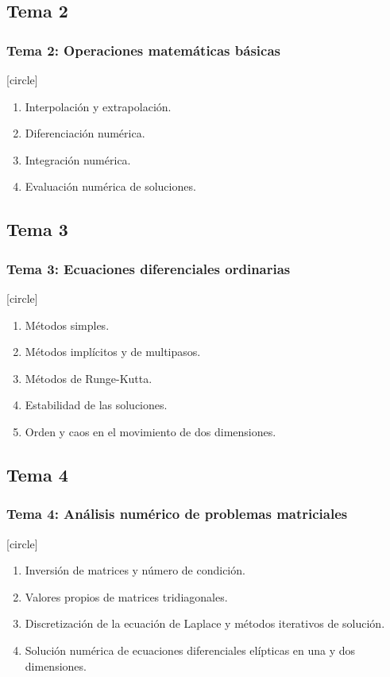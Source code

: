 \documentclass[12pt]{beamer}
\begin{document}
\subsection*{Tema 2}
\begin{frame}
\frametitle{\textbf{Tema 2: Operaciones matemáticas básicas}}
[circle]
\begin{enumerate}[<+->]
\item Interpolación y extrapolación.
\item Diferenciación numérica.
\item Integración numérica.
\item Evaluación numérica de soluciones.
\end{enumerate}
\end{frame}
\subsection*{Tema 3}
\begin{frame}
\frametitle{\textbf{Tema 3: Ecuaciones diferenciales ordinarias}}
[circle]
\begin{enumerate}[<+->]
\item Métodos simples.
\item Métodos implícitos y de multipasos.
\item Métodos de Runge-Kutta.
\item Estabilidad de las soluciones.
\item Orden y caos en el movimiento de dos dimensiones.
\end{enumerate}
\end{frame}
\subsection*{Tema 4}
\begin{frame}
\frametitle{\textbf{Tema 4: Análisis numérico de problemas matriciales}}
[circle]
\begin{enumerate}[<+->]
\item Inversión de matrices y número de condición.
\item Valores propios de matrices tridiagonales.
\item Discretización de la ecuación de Laplace y métodos iterativos de solución.
\item Solución numérica de ecuaciones diferenciales elípticas en una y dos dimensiones.
\end{enumerate}
\end{frame}
\end{document}
